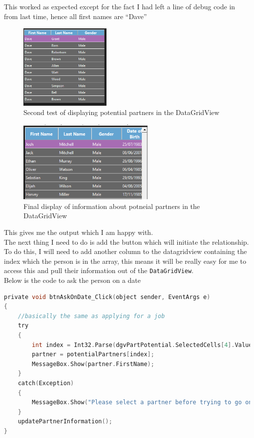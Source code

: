 This worked as expected except for the fact I had left a line of debug code in from last time, hence all first names are “Dave”
\begin{figure}[H]
    \centering
    \includegraphics[width=0.4\textwidth]{images/implementation/partners3.png}
    \caption{Second test of displaying potential partners in the DataGridView}
    \label{fig:implementation-partners3}
\end{figure}
\begin{figure}[H]
    \centering
    \includegraphics[width=0.6\textwidth]{images/implementation/partners4.png}
    \caption{Final display of information about potneial partners in the DataGridView}
    \label{fig:implementation-partners4}
\end{figure}
\noindent This gives me the output which I am happy with.\\
The next thing I need to do is add the button which will initiate the relationship. To do this, I will need to add another column to the datagridview containing the index which the person is in the array, this means it will be really easy for me to access this and pull their information out of the \verb|DataGridView|.\\
Below is the code to ask the person on a date
\begin{lstlisting}[language=c, style=csharp, caption=Code to ask someone on a date]
private void btnAskOnDate_Click(object sender, EventArgs e)
{
    //basically the same as applying for a job
    try 
    {
        int index = Int32.Parse(dgvPartPotential.SelectedCells[4].Value.ToString());
        partner = potentialPartners[index];
        MessageBox.Show(partner.FirstName);
    }
    catch(Exception)
    {
        MessageBox.Show("Please select a partner before trying to go on a date with them.");
    }
    updatePartnerInformation();
}
\end{lstlisting}
